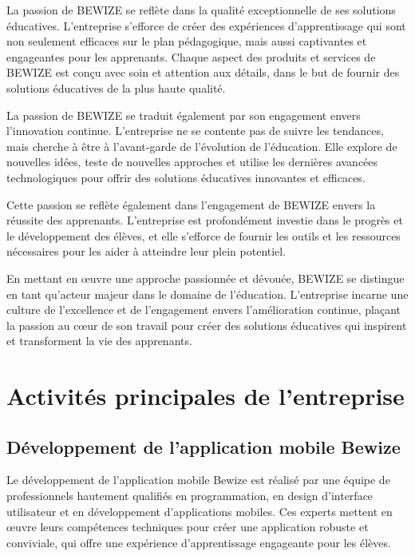 La passion de BEWIZE se reflète dans la qualité exceptionnelle de ses solutions éducatives. L'entreprise s'efforce de créer des expériences d'apprentissage qui sont non seulement efficaces sur le plan pédagogique, mais aussi captivantes et engageantes pour les apprenants. Chaque aspect des produits et services de BEWIZE est conçu avec soin et attention aux détails, dans le but de fournir des solutions éducatives de la plus haute qualité.

La passion de BEWIZE se traduit également par son engagement envers l'innovation continue. L'entreprise ne se contente pas de suivre les tendances, mais cherche à être à l'avant-garde de l'évolution de l'éducation. Elle explore de nouvelles idées, teste de nouvelles approches et utilise les dernières avancées technologiques pour offrir des solutions éducatives innovantes et efficaces.

Cette passion se reflète également dans l'engagement de BEWIZE envers la réussite des apprenants. L'entreprise est profondément investie dans le progrès et le développement des élèves, et elle s'efforce de fournir les outils et les ressources nécessaires pour les aider à atteindre leur plein potentiel.

En mettant en œuvre une approche passionnée et dévouée, BEWIZE se distingue en tant qu'acteur majeur dans le domaine de l'éducation. L'entreprise incarne une culture de l'excellence et de l'engagement envers l'amélioration continue, plaçant la passion au cœur de son travail pour créer des solutions éducatives qui inspirent et transforment la vie des apprenants.








\section{Activités principales de l'entreprise}
\subsection{Développement de l'application mobile Bewize}  
    
    Le développement de l'application mobile Bewize est réalisé par une équipe de professionnels hautement qualifiés en programmation, en design d'interface utilisateur et en développement d'applications mobiles. Ces experts mettent en œuvre leurs compétences techniques pour créer une application robuste et conviviale, qui offre une expérience d'apprentissage engageante pour les élèves.

